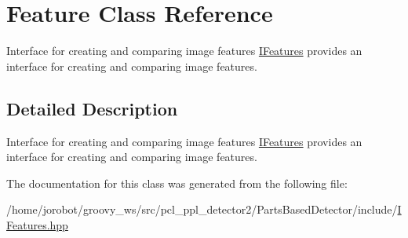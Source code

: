 \hypertarget{classFeature}{\section{\-Feature \-Class \-Reference}
\label{classFeature}
}


\-Interface for creating and comparing image features \hyperlink{classIFeatures}{\-I\-Features} provides an interface for creating and comparing image features.  




\subsection{\-Detailed \-Description}
\-Interface for creating and comparing image features \hyperlink{classIFeatures}{\-I\-Features} provides an interface for creating and comparing image features. 

\-The documentation for this class was generated from the following file\-:\begin{DoxyCompactItemize}
\item 
/home/jorobot/groovy\-\_\-ws/src/pcl\-\_\-ppl\-\_\-detector2/\-Parts\-Based\-Detector/include/\hyperlink{IFeatures_8hpp}{\-I\-Features.\-hpp}\end{DoxyCompactItemize}
